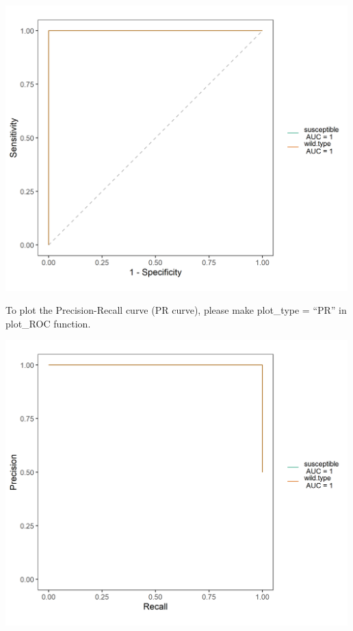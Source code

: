 \documentclass[
]{book}
\newenvironment{Shaded}{\begin{snugshade}}{\end{snugshade}}
\newcommand{\AttributeTok}[1]{\textcolor[rgb]{0.77,0.63,0.00}{#1}}
\newcommand{\FloatTok}[1]{\textcolor[rgb]{0.00,0.00,0.81}{#1}}
\newcommand{\FunctionTok}[1]{\textcolor[rgb]{0.00,0.00,0.00}{#1}}
\newcommand{\NormalTok}[1]{#1}
\newcommand{\SpecialCharTok}[1]{\textcolor[rgb]{0.00,0.00,0.00}{#1}}
\newcommand{\StringTok}[1]{\textcolor[rgb]{0.31,0.60,0.02}{#1}}
\begin{document}
\begin{center}\includegraphics[width=500px]{Images/plot_ROC_with_selection} \end{center}

To plot the Precision-Recall curve (PR curve), please make plot\_type = ``PR'' in plot\_ROC function.

\begin{Shaded}
\end{Shaded}

\begin{center}\includegraphics[width=500px]{Images/plot_PR_with_selection} \end{center}
\end{document}
